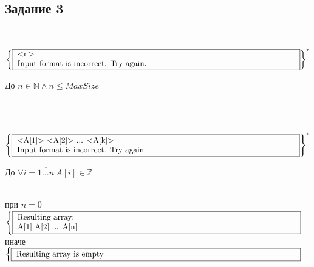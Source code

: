 \subsection*{Задание 3}
\\[0.3cm]
\noindent
\begin{minipage}{0.4\textwidth}
    \(\left\{
         \fbox{
            \parbox{\textwidth} {
                \text{<n>}\\
                \text{Input format is incorrect. Try again.}  
            }
        }
    \right\}^{*}\) 
\end{minipage}%
\hfill
\begin{minipage}{0.5\textwidth}
    До \(n \in \mathbb{N} \land n \leq MaxSize\)
\end{minipage}%
\\[0.3cm]
\\[0.3cm]
\noindent
\begin{minipage}{0.4\textwidth}
    \(\left\{
        \fbox{
            \parbox{\textwidth} {
                \text{<A[1]> <A[2]> ... <A[k]>}\\
                \text{Input format is incorrect. Try again.}  
            }
        }
    \right\}^{*}\) 
\end{minipage}%
\hfill
\begin{minipage}{0.5\textwidth}
    До \(\forall i = \overline{1 \dots n}\ A[i] \in \mathbb{Z}\) 
\end{minipage}%
\\[0.3cm]
при \(n = 0\)\\[0.2cm]
\(\begin{cases}
    \fbox{
    \parbox{\textwidth} {
        Resulting array:\\
        A[1] A[2] ... A[n]
    }
}
\end{cases}\)\\[0.2cm]
иначе\\[0.2cm]
\(\begin{cases}
    \fbox{
    \parbox{\textwidth} {
        Resulting array is empty
    }
}
\end{cases}\)